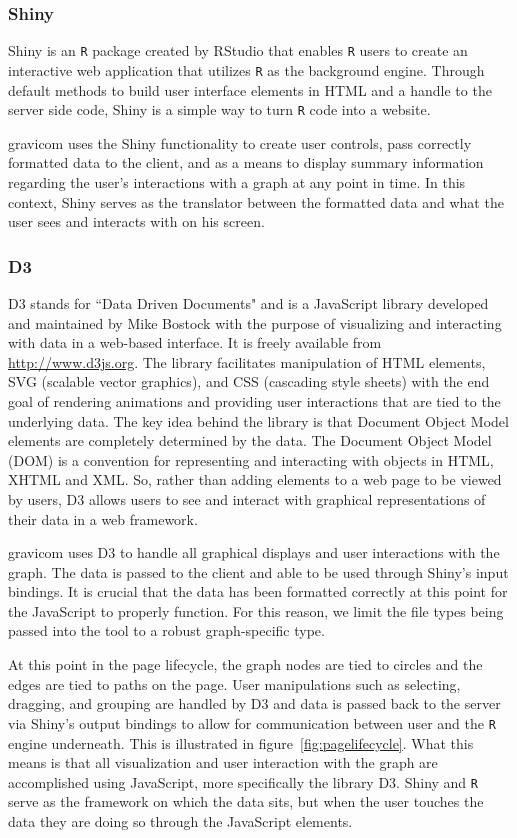 \documentclass{article}\usepackage[]{graphicx}\usepackage[]{color}
\begin{document}
\subsubsection{Shiny}

Shiny \cite{rs-shiny} is an {\tt R} package created by RStudio that enables {\tt R} users to create an interactive web application that utilizes {\tt R} as the background engine. Through default methods to build user interface elements in HTML and a handle to the server side code, Shiny is a simple way to turn {\tt R} code into a website. 

gravicom uses the Shiny functionality to create user controls, pass correctly formatted data to the client, and as a means to display summary information regarding the user's interactions with a graph at any point in time. In this context, Shiny serves as the translator between the formatted data and what the user sees and interacts with on his screen.


\subsubsection{D3}

D3 \cite{mb-d3} stands for ``Data Driven Documents" and is a JavaScript library developed and maintained by Mike Bostock with the  purpose of visualizing and interacting with data in a web-based interface. It is freely available from \url{http://www.d3js.org}. The library facilitates manipulation of HTML elements, SVG (scalable vector graphics), and CSS (cascading style sheets) with the end goal of rendering animations and providing user interactions that are tied to the underlying data. The key idea behind the library is that Document Object Model elements are completely determined by the data. The Document Object Model (DOM) is a convention for representing and interacting with objects in HTML, XHTML and XML. So, rather than adding elements to a web page to be viewed by users, D3 allows users to see and interact with graphical representations of their data in a web framework. 

gravicom uses D3 to handle all graphical displays and user interactions with the graph. The data is passed to the client and able to be used through Shiny's input bindings. It is crucial that the data has been formatted correctly at this point for the JavaScript to properly function. For this reason, we limit the file types being passed into the tool to a robust graph-specific type.

At this point in the page lifecycle, the graph nodes are tied to circles and the edges are tied to paths on the page. User manipulations such as selecting, dragging, and grouping are handled by D3 and  data is passed back to the server via Shiny's output bindings to allow for communication between user and the {\tt R} engine underneath. This is illustrated in figure~\ref{fig:pagelifecycle}. What this means is that all visualization and user interaction with the graph are accomplished using JavaScript, more specifically the library D3. Shiny and {\tt R} serve as the framework on which the data sits, but when the user touches the data they are doing so through the JavaScript elements. 
\end{document}
